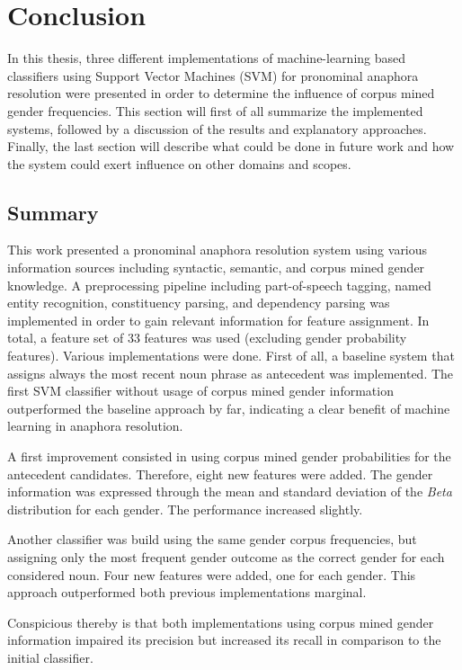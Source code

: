 \chapter{Conclusion}
\label{sec:Conclusion}
In this thesis, three different implementations of machine-learning based classifiers using Support Vector Machines (SVM) for pronominal anaphora resolution were presented in order to determine the influence of corpus mined gender frequencies. This section will first of all summarize the implemented systems, followed by a discussion of the results and explanatory approaches. Finally, the last section will describe what could be done in future work and how the system could exert influence on other domains and scopes.

\section{Summary}
This work presented a pronominal anaphora resolution system using various information sources including syntactic, semantic, and corpus mined gender knowledge. A preprocessing pipeline including part-of-speech tagging, named entity recognition, constituency parsing, and dependency parsing was implemented in order to gain relevant information for feature assignment. In total, a feature set of 33 features was used (excluding gender probability features). Various implementations were done. First of all, a baseline system that assigns always the most recent noun phrase as antecedent was implemented. The first SVM classifier without usage of corpus mined gender information outperformed the baseline approach by far, indicating a clear benefit of machine learning in anaphora resolution. 

A first improvement consisted in using corpus mined gender probabilities for the antecedent candidates. Therefore, eight new features were added. The gender information was expressed through the mean and standard deviation of the \textit{Beta} distribution for each gender. The performance increased slightly. 

Another classifier was build using the same gender corpus frequencies, but assigning only the most frequent gender outcome as the correct gender for each considered noun. Four new features were added, one for each gender. This approach outperformed both previous implementations marginal.

Conspicious thereby is that both implementations using corpus mined gender information impaired its precision but increased its recall in comparison to the initial classifier. 

